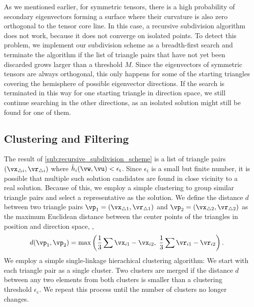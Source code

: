 %
As we mentioned earlier,  for symmetric
tensors, there is a high probability of secondary eigenvectors forming a
surface where their curvature is also zero orthogonal to the tensor core line.
%
In this case, a recursive subdivision algorithm does not work, because it does
not converge on isolated points.
%
To detect this problem, we implement our subdivision scheme as a breadth-first
search and terminate the algorithm if the list of triangle pairs that have
not yet been discarded grows larger than a threshold $M$.
%
Since the eigenvectors of symmetric tensors are always orthogonal, this only
happens for some of the starting triangles covering the hemisphere of possible
eigenvector directions.
%
If the search is terminated in this way for one starting triangle in direction
space, we still continue searching in the other directions, as an isolated
solution might still be found for one of them.
%
%

\subsection{Clustering and Filtering} %
\label{sub:clustering_and_filtering}
% 
The result of \cref{sub:recursive_subdivision_scheme} is a list of triangle
pairs $(\vx_{\triangle i}, \vr_{\triangle i})$ where $\hat{h}_i(\vw, \vu) <
\epsilon_{\mathrm{t}}$.
%
Since $\epsilon_{\mathrm{t}}$ is a small but finite number, it is possible that
multiple such solution candidates are found in close vicinity to a real solution.
%
Because of this, we employ a simple clustering to group similar triangle pairs
and select a representative as the solution.
%
We define the distance $d$ between two triangle pairs $\vp_1 = (\vx_{\triangle 1},
\vr_{\triangle 1})$ and $\vp_2 = (\vx_{\triangle 2}, \vr_{\triangle 2})$ as the
maximum Euclidean distance between the center points of the triangles in
position and direction space, \ie,
%
\begin{equation}
  d(\vp_1, \vp_2)
    = \max\left(\frac{1}{3}\sum \vx_{i1} - \vx_{i2},
      \; \frac{1}{3}\sum \vr_{i1} - \vr_{i2}\right) \text{.}
\end{equation}
%
We employ a simple single-linkage hierachical clustering algorithm:
%
We start with each triangle pair as a single cluster.
%
Two clusters are merged if the distance $d$ between any two elements from both
clusters is smaller than a clustering threshold $\epsilon_{\mathrm{c}}$.
%
We repeat this process until the number of clusters no longer changes.
%


